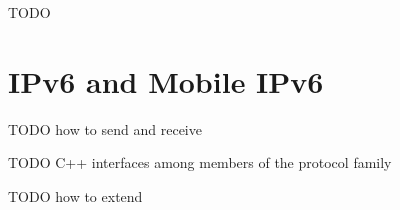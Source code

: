 \ifdraft TODO

\chapter{IPv6 and Mobile IPv6}
\label{cha:ipv6}

TODO how to send and receive

TODO C++ interfaces among members of the protocol family 

TODO how to extend

\fi


